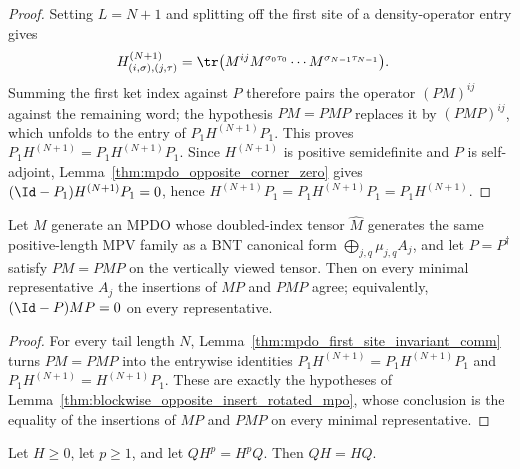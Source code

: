 \begin{proof}
    \leanok
    Setting $L=N+1$ and splitting off the first site of a density-operator
    entry gives
    \begin{align}
        H^{(N+1)}_{(i,\sigma),(j,\tau)}
         & =\tr\bigl(M^{ij}M^{\sigma_0\tau_0}\cdots
        M^{\sigma_{N-1}\tau_{N-1}}\bigr).
        \notag
    \end{align}
    Summing the first ket index against $P$ therefore pairs the operator
    $(PM)^{ij}$ against the remaining word; the hypothesis $PM=PMP$ replaces
    it by $(PMP)^{ij}$, which unfolds to the entry of
    $P_1H^{(N+1)}P_1$. This proves
    $P_1H^{(N+1)}=P_1H^{(N+1)}P_1$. Since $H^{(N+1)}$ is positive semidefinite
    and $P$ is self-adjoint, Lemma~\ref{thm:mpdo_opposite_corner_zero}
    gives $(\Id-P_1)H^{(N+1)}P_1=0$, hence
    $H^{(N+1)}P_1=P_1H^{(N+1)}P_1=P_1H^{(N+1)}$.
\end{proof}

\begin{lemma}
    \label{thm:blockwise_one_sub_mp_zero}
    \leanok
    Let $M$ generate an MPDO whose doubled-index tensor $\widehat M$ generates
    the same positive-length MPV family as a BNT canonical form
    $\bigoplus_{j,q}\mu_{j,q}A_j$, and let $P=P^\dagger$ satisfy $PM=PMP$ on
    the vertically viewed tensor. Then on every minimal representative
    $A_j$ the insertions of $MP$ and $PMP$ agree; equivalently,
    $(\Id-P)MP=0$ on every representative.
\end{lemma}

\begin{proof}
    \leanok
    For every tail length $N$, Lemma~\ref{thm:mpdo_first_site_invariant_comm}
    turns $PM=PMP$ into the entrywise identities
    $P_1H^{(N+1)}=P_1H^{(N+1)}P_1$ and
    $P_1H^{(N+1)}=H^{(N+1)}P_1$. These are exactly the hypotheses of
    Lemma~\ref{thm:blockwise_opposite_insert_rotated_mpo}, whose conclusion
    is the equality of the insertions of $MP$ and $PMP$ on every minimal
    representative.
\end{proof}

\begin{lemma}
    \label{thm:psd_commute_of_commute_pow_matrix}
    \leanok
    Let $H\geq0$, let $p\geq1$, and let $QH^p=H^pQ$. Then $QH=HQ$.
\end{lemma}


